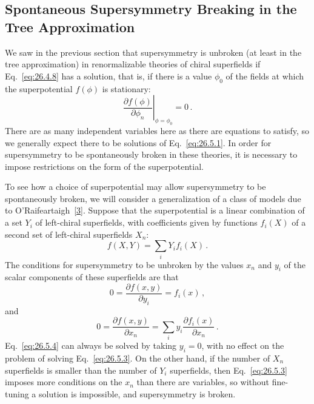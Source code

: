 
\subsection{Spontaneous Supersymmetry Breaking in the Tree Approximation}

We saw in the previous section that supersymmetry is unbroken (at least in the
tree approximation) in renormalizable theories of chiral superfields if
Eq.~\eqref{eq:26.4.8} has a solution, that is, if there is a value $\phi_0$ of
the fields at which the superpotential $f(\phi)$ is stationary:
\begin{equation}
  \left.
  \frac{\partial f(\phi)}{\partial\phi_n}
  \right|_{\phi=\phi_0}=0\,.
  \tag{26.5.1}\label{eq:26.5.1}
\end{equation}
There are as many independent variables here as there are equations to
satisfy, so we generally expect there to be solutions of
Eq.~\eqref{eq:26.5.1}. In order for supersymmetry to be spontaneously broken
in these theories, it is necessary to impose restrictions on the form of the
superpotential.

To see how a choice of superpotential may allow supersymmetry to be
spontaneously broken, we will consider a generalization of a class of models
due to O'Raifeartaigh~\hyperref[ch26-ref-3]{[3]}. Suppose that the
superpotential is a linear combination of a set $Y_i$ of left-chiral
superfields, with coefficients given by functions $f_i(X)$ of a second set of
left-chiral superfields $X_n$:
\begin{equation}
  f(X,Y)=\sum_i Y_i f_i(X)\,.
  \tag{26.5.2}\label{eq:26.5.2}
\end{equation}
The conditions for supersymmetry to be unbroken by the values $x_n$ and $y_i$
of the scalar components of these superfields are that
\begin{equation}
  0=\frac{\partial f(x,y)}{\partial y_i}=f_i(x)\,,
  \tag{26.5.3}\label{eq:26.5.3}
\end{equation}
and
\begin{equation}
  0=\frac{\partial f(x,y)}{\partial x_n}
   =\sum_i y_i\frac{\partial f_i(x)}{\partial x_n}\,.
  \tag{26.5.4}\label{eq:26.5.4}
\end{equation}
Eq.~\eqref{eq:26.5.4} can always be solved by taking $y_i=0$, with no effect
on the problem of solving Eq.~\eqref{eq:26.5.3}. On the other hand, if the
number of $X_n$ superfields is smaller than the number of $Y_i$ superfields,
then Eq.~\eqref{eq:26.5.3} imposes more conditions on the $x_n$ than there are
variables, so without fine-tuning a solution is impossible, and
supersymmetry is broken.

